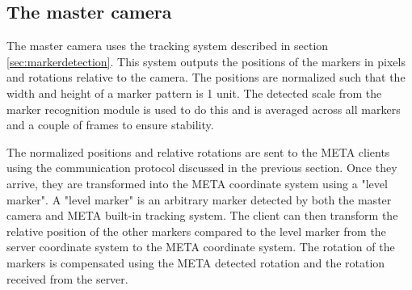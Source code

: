         \subsection{The master camera} \label{ssec:mastercamera}
            The master camera uses the tracking system described in section
            \ref{sec:markerdetection}. This system outputs the positions of the
            markers in pixels and rotations relative to the camera. The
            positions are normalized such that the width and height of a marker
            pattern is 1 unit. The detected scale from the marker recognition
            module is used to do this and is averaged across all markers and a
            couple of frames to ensure stability.

            The normalized positions and relative rotations are sent to the META
            clients using the communication protocol discussed in the previous
            section. Once they arrive, they are transformed into the META
            coordinate system using a "level marker". A "level marker" is an
            arbitrary marker detected by both the master camera and META
            built-in tracking system. The client can then transform the relative
            position of the other markers compared to the level marker from the
            server coordinate system to the META coordinate system. The rotation
            of the markers is compensated using the META detected rotation and
            the rotation received from the server.
